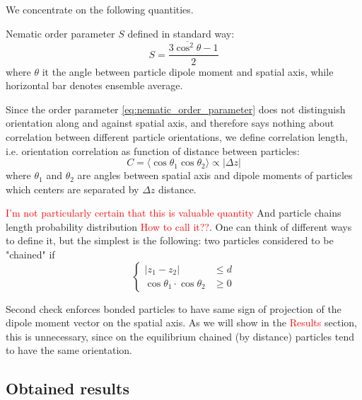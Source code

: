 We concentrate on the following quantities.

Nematic order parameter $S$ defined in standard way:
\begin{equation}
\label{eq:nematic_order_parameter}
	S = \frac{3 \overline{\cos^2 \theta} - 1}{2}
\end{equation}
where $\theta$ it the angle between particle dipole moment and spatial axis, while horizontal bar denotes ensemble average.

Since the order parameter \eqref{eq:nematic_order_parameter} does not distinguish orientation along and against spatial axis, and therefore says nothing about correlation between different particle orientations, we define correlation length, i.e. orientation correlation as function of distance between particles:
\begin{equation}
	C = \langle\cos \theta_1 \cos \theta_2\rangle \propto |\Delta z|
\end{equation}
where $\theta_1$ and $\theta_2$ are angles between spatial axis and dipole moments of particles which centers are separated by $\Delta z$ distance.

\textcolor{red}{I'm not particularly certain that this is valuable quantity}
And particle chains length probability distribution \textcolor{red}{How to call it??}. One can think of different ways to define it, but the simplest is the following: two particles considered to be "chained" if 
\begin{equation}
\begin{cases}
	|z_1 - z_2| &\leq d \\
	\cos \theta_1 \cdot \cos \theta_2 &\geq 0
\end{cases}
\end{equation}

Second check enforces bonded particles to have same sign of projection of the dipole moment vector on the spatial axis. As we will show in the \textcolor{red}{Results} section, this is unnecessary, since on the equilibrium chained (by distance) particles tend to have the same orientation.

\subsection{Obtained results}